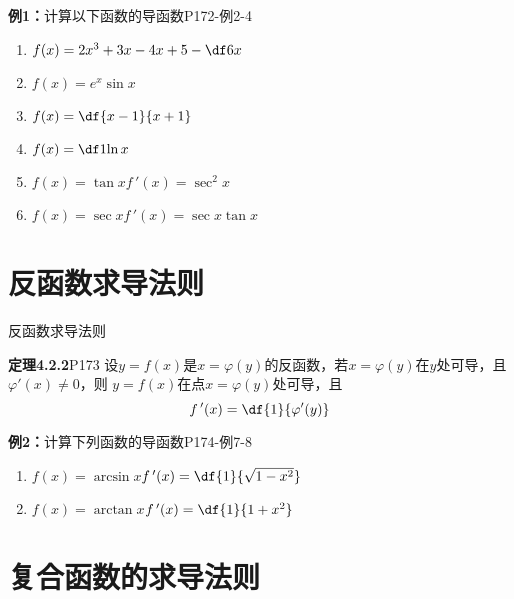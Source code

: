 \begin{frame}
	\linespread{1.2}\pause 
	\begin{exampleblock}{{\bf 例1：}计算以下函数的导函数\hfill P172-例2-4}
		\begin{enumerate}
		  \item $f(x)=2x^3+3x-4x+5-\df 6x$\pause 
		  \item $f(x)=e^x\sin x$\pause 
		  \item $f(x)=\df{x-1}{x+1}$\pause 
		  \item $f(x)=\df 1{\ln x}$\pause 
		  \item $f(x)=\tan x$\pause \hfill $f\,'(x)=\sec^2 x$\pause 
		  \item $f(x)=\sec x$\pause \hfill $f\,'(x)=\sec x\tan x$
		\end{enumerate}
	\end{exampleblock}
\end{frame}

\section{反函数求导法则}

\begin{frame}{反函数求导法则}
	\linespread{1}\pause 
	\begin{block}{{\bf 定理4.2.2}\hfill P173}
		设$y=f(x)$是$x=\varphi(y)$的反函数，若$x=\varphi(y)$在$y$处可导，且$\varphi'(x)\ne 0$，则
		$y=f(x)$在点$x=\varphi(y)$处可导，且
		$$f\,'(x)=\df{1}{\varphi'(y)}$$
	\end{block}\pause 
	\begin{exampleblock}{{\bf 例2：}计算下列函数的导函数\hfill P174-例7-8}
		\begin{enumerate}
		  \item $f(x)=\arcsin x$\pause \hfill $f\,'(x)=\df{1}{\sqrt{1-x^2}}$\pause 
		  \vspace{-1ex}
		  \item $f(x)=\arctan x$\pause \hfill $f\,'(x)=\df{1}{1+x^2}$
		\end{enumerate}
	\end{exampleblock}
\end{frame}

\section{复合函数的求导法则}

